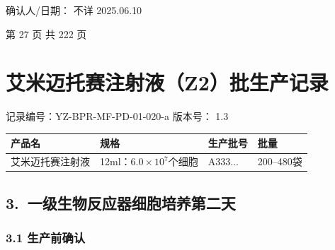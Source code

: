 \documentclass[UTF8,10pt,a4paper,fontset=fandol]{ctexart}
\newcommand{\fieldvalue}[1]{#1}
\newcommand{\handwritten}[1]{#1}
\begin{document}
确认人/日期：
\fieldvalue{\handwritten{不详}}
\quad
\fieldvalue{\handwritten{2025.06.10}}

\begin{center}
第 27 页 共 222 页
\end{center}

\newpage

\section*{艾米迈托赛注射液（Z2）批生产记录}

记录编号：YZ-BPR-MF-PD-01-020-a\hfill
版本号：
\fieldvalue{1.3}

\begin{tabularx}{\textwidth}{|X|X|X|X|}
\hline
产品名 & 规格 & 生产批号 & 批量 \\
\hline
\fieldvalue{艾米迈托赛注射液}
&
\fieldvalue{12ml：$6.0\times10^{7}$个细胞}
&
\fieldvalue{\handwritten{A333...}}
&
\fieldvalue{200--480袋}
\\
\hline
\end{tabularx}

\subsection*{3.\ 一级生物反应器细胞培养第二天}

\subsubsection*{3.1 生产前确认}
\end{document}
